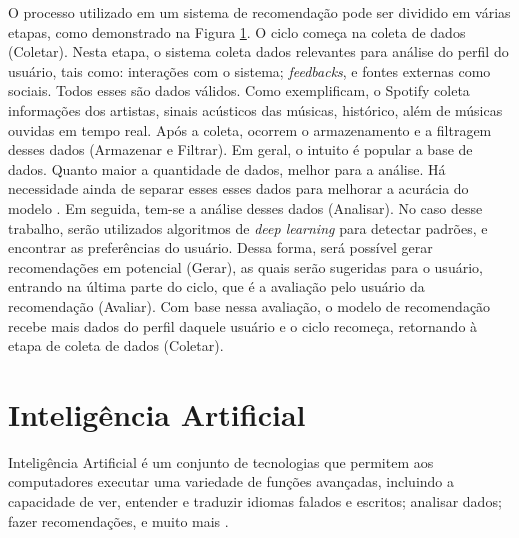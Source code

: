 O processo utilizado em um sistema de recomendação pode ser dividido em várias etapas, como demonstrado na Figura 
\hyperref[fig:ciclosr]{1}. O ciclo começa na coleta de dados (Coletar). Nesta etapa, o sistema coleta dados relevantes para análise
do perfil do usuário, tais como: interações com o sistema; \textit{feedbacks}, e fontes externas como sociais. Todos esses são dados válidos. 
Como  exemplificam, o Spotify coleta informações dos artistas, sinais acústicos das músicas, histórico, 
além de músicas ouvidas em tempo real.
Após a coleta, ocorrem o armazenamento e a filtragem desses dados (Armazenar e Filtrar). Em geral, o intuito é popular a 
base de dados. Quanto maior a quantidade de dados,
melhor para a análise. Há necessidade ainda de separar esses esses dados para melhorar a acurácia do modelo \cite{pham2019recommendation}.
Em seguida, 
tem-se a análise desses dados (Analisar). No caso desse trabalho, serão utilizados algoritmos de \textit{deep learning} para detectar padrões,
e encontrar as preferências do usuário. Dessa forma, será possível gerar recomendações em potencial (Gerar), 
as quais serão sugeridas para o usuário, entrando na última parte do ciclo, que é a avaliação pelo usuário da 
recomendação (Avaliar). Com base nessa avaliação, o modelo de recomendação 
recebe mais dados do perfil daquele usuário e o ciclo recomeça, retornando à etapa de coleta de dados (Coletar).

\section{Inteligência Artificial}\label{sec:ia}

Inteligência Artificial é um conjunto de tecnologias que permitem aos computadores executar uma variedade de 
funções avançadas, incluindo a capacidade de ver, entender e traduzir idiomas falados e escritos; analisar dados; 
fazer recomendações, e muito mais \cite{Suleimenov}.

